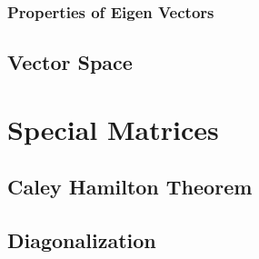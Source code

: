 \subsubsection{Properties of Eigen Vectors}
\subsection{Vector Space}

\section{Special Matrices}
\subsection{Caley Hamilton Theorem}
\subsection{Diagonalization}
